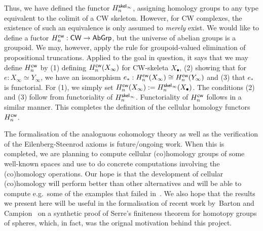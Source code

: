 \documentclass[a4page]{article}
\begin{document}
Thus, we have defined the functor $\textnormal{\ensuremath{H^{\mathsf{skel}_\infty}_{n}}}$, assigning homology groups to any type equivalent to the colimit of a CW skeleton. However, for CW complexes, the existence of such an equivalence is only assumed to \emph{merely} exist. We would like to define a fuctor $\textnormal{\ensuremath{H^{\mathsf{cw}}_{n}}} : \mathsf{CW} \to \textnormal{\ensuremath{\mathsf{AbGrp}}}$, but the universe of abelian groups is a groupoid. We may, however, apply the rule for groupoid-valued elimination of propositional truncations. Applied to the goal in question, it says that we may define $\textnormal{\ensuremath{H^{\mathsf{cw}}_{n}}}$ by (1) defining $\textnormal{\ensuremath{H^{\mathsf{cw}}_{n}}}(X_\infty)$ for CW-skeleta $X_\bullet$, (2) showing that for $e : X_\infty \simeq Y_{\infty}$, we have an isomorphism $e_* : \textnormal{\ensuremath{H^{\mathsf{cw}}_{n}}}(X_\infty) \cong \textnormal{\ensuremath{H^{\mathsf{cw}}_{n}}}(Y_\infty)$ and (3) that $e_*$ is functorial. For (1), we simply set $\textnormal{\ensuremath{H^{\mathsf{cw}}_{n}}}(X_\infty) := \textnormal{\ensuremath{H^{\mathsf{skel}_\infty}_{n}}}(X_\bullet)$. The conditions (2) and (3) follow from functoriality of $\textnormal{\ensuremath{H^{\mathsf{skel}_\infty}_{n}}}$. Functoriality of $\textnormal{\ensuremath{H^{\mathsf{cw}}_{n}}}$ follows in a similar manner. This completes the definition of the cellular homology functors~$\textnormal{\ensuremath{H^{\mathsf{cw}}_{n}}}$.

The formalisation of the analoguous cohomology theory as well as the verification of the Eilenberg-Steenrod axioms is future/ongoing work. When this is completed, we are planning to compute cellular (co)homology groups of some well-known spaces and use \CubicalAgda to do concrete computations involving the (co)homology operations. Our hope is that the development of cellular (co)homology will perform better than other alternatives and will be able to compute e.g.\ some of the examples that failed in~\cite[Section 6]{BLM22}. We also hope that the results we present here will be useful in the formalisation of recent work by~Barton and Campion~\cite{SerreFiniteness} on a synthetic proof of Serre's finiteness theorem for homotopy groups of spheres, which, in fact, was the orignal motivation behind this project.

\printbibliography
\end{document}
